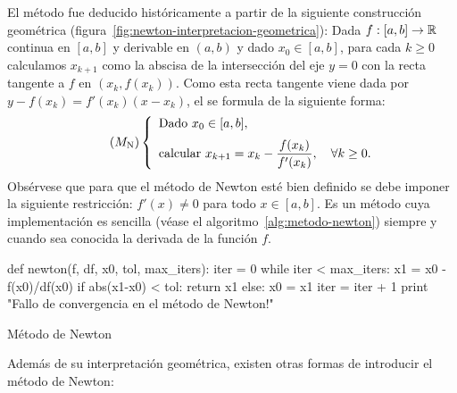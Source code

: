El método fue deducido históricamente a partir de la siguiente
construcción geométrica
(figura~\ref{fig:newton-interpretacion-geometrica}): Dada
$f:[a,b]\to\operatorname{{\mathbb R}}$ continua en $[a,b]$ y derivable en $(a,b)$ y dado
$x_0\in [a,b]$, para cada $k\ge 0$ calculamos $x_{k+1}$ como la
abscisa de la intersección del eje $y=0$ con la recta tangente a $f$
en $(x_k,f(x_k))$. Como esta recta tangente viene dada por
$y-f(x_k) = f'(x_k)(x-x_k)$, el  se formula de la siguiente forma:
\begin{equation}
  \tag{$M_{\text{N}}$}
  \left\{
    \begin{array}{l}
      \text{Dado } x_0\in [a,b], \\ \noalign{\medskip}
      \text{calcular } x_{k+1} = x_k - \dfrac{f(x_k)}{f'(x_k)} , \quad \forall k\ge 0.
    \end{array}
  \right.
  \label{eq:MetNewton}
\end{equation}
Obsérvese que para que el método de Newton esté bien definido se debe
imponer la siguiente restricción: $f'(x)\neq 0$ para todo $x\in
[a,b]$. Es un método cuya implementación es sencilla (véase el
algoritmo~\ref{alg:metodo-newton}) siempre y cuando sea conocida la
derivada de la función $f$.
\begin{algorithm}  \begin{python}
def newton(f, df, x0, tol, max_iters):
    iter = 0
    while iter < max_iters:
        x1 = x0 - f(x0)/df(x0)
        if abs(x1-x0) < tol: 
            return x1
        else:
            x0 = x1
            iter = iter + 1        
    print "Fallo de convergencia en el método de Newton!"
\end{python}
\caption{Método de Newton}
\label{alg:metodo-newton}
\end{algorithm}
Además de su interpretación geométrica, existen otras formas de
introducir el método de Newton:
